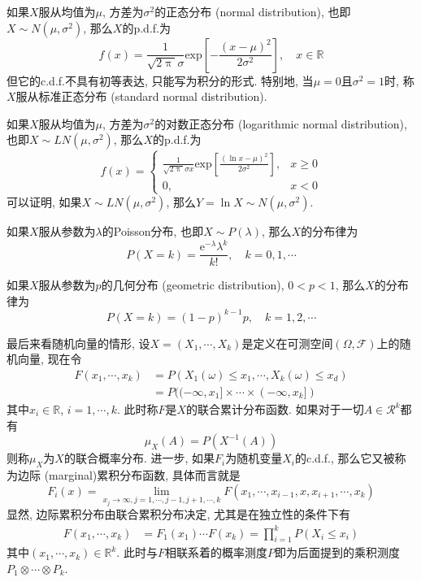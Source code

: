 \documentclass[cn, 12pt, math=mtpro2, bibstyle=apa, blue, twocol]{elegantbook}
\newcommand{\F}{\mathcal{F}}
\newcommand{\R}{\mathbb{R}}
\begin{document}
\begin{example}[正态分布]
如果$X$服从均值为$\mu$, 方差为$\sigma^2$的正态分布 (normal distribution), 也即$X\sim N(\mu,\sigma^2)$, 那么$X$的p.d.f.为
$$f(x)=\frac{1}{\sqrt{2\uppi}\sigma}\text{exp}\left[-\frac{(x-\mu)^2}{2\sigma^2}\right],\quad x\in\R$$
但它的c.d.f.不具有初等表达, 只能写为积分的形式. 特别地, 当$\mu=0$且$\sigma^2=1$时, 称$X$服从标准正态分布 (standard normal distribution).
\end{example}

\begin{example}[对数正态分布]
如果$X$服从均值为$\mu$, 方差为$\sigma^2$的对数正态分布 (logarithmic normal distribution), 也即$X\sim LN(\mu,\sigma^2)$, 那么$X$的p.d.f.为
$$f(x)=\begin{cases}
         \displaystyle\frac{1}{\sqrt{2\uppi}\sigma x}\text{exp}\left[\frac{(\ln x-\mu)^2}{2\sigma^2}\right], & x\ge0 \\
         0, & x<0
       \end{cases}$$
可以证明, 如果$X\sim LN(\mu,\sigma^2)$, 那么$Y=\ln X\sim N(\mu,\sigma^2)$.
\end{example}

\begin{example}[$\,$Poisson分布]
如果$X$服从参数为$\lambda$的Poisson分布, 也即$X\sim P(\lambda)$, 那么$X$的分布律为
$$P(X=k)=\frac{\text{e}^{-\lambda}\lambda^k}{k!},\quad k=0,1,\cdots$$
\end{example}

\begin{example}[几何分布]
如果$X$服从参数为$p$的几何分布 (geometric distribution), $0<p<1$, 那么$X$的分布律为
$$P(X=k)=(1-p)^{k-1}p,\quad k=1,2,\cdots$$
\end{example}

最后来看随机向量的情形, 设$X=(X_1,\cdots,X_k)$是定义在可测空间$(\Omega,\F)$上的随机向量, 现在令
\begin{align*}
F(x_1,\cdots,x_k)&=P(X_1(\omega)\leq x_1,\cdots,X_k(\omega)\leq x_d) \\
&=P((-\infty,x_1]\times\cdots\times (-\infty,x_k])
\end{align*}
其中$x_i\in\R$, $i=1,\cdots,k$. 此时称$F$是$X$的联合累计分布函数. 如果对于一切$A\in \mathcal{R}^k$都有
$$\mu_X(A)=P(X^{-1}(A))$$
则称$\mu_X$为$X$的联合概率分布. 进一步, 如果$F_i$为随机变量$X_i$的c.d.f., 那么它又被称为边际 (marginal)累积分布函数, 具体而言就是
$$F_i(x)=\lim_{x_j\to\infty, j=1,\cdots,j-1,j+1,\cdots,k}F(x_1,\cdots,x_{i-1},x,x_{i+1},\cdots,x_k)$$
显然, 边际累积分布由联合累积分布决定, 尤其是在独立性的条件下有
\begin{align*}
F(x_1,\cdots,x_k)&=F_1(x_1)\cdots F(x_k)=\prod_{i=1}^kP(X_i\leq x_i)
\end{align*}
其中$(x_1,\cdots,x_k)\in\R^k$. 此时与$F$相联系着的概率测度$P$即为后面提到的乘积测度$P_1\otimes\cdots\otimes P_k$.
\end{document}
